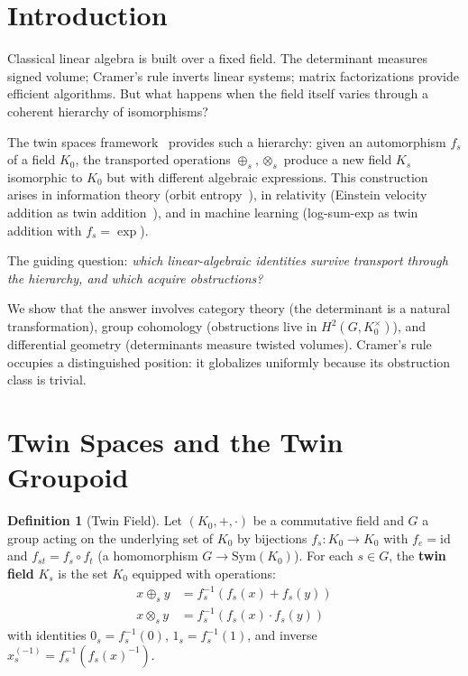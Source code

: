 \documentclass[11pt,twocolumn]{article}
\theoremstyle{plain}
\theoremstyle{definition}
\newtheorem{definition}[theorem]{Definition}
\theoremstyle{remark}
\begin{document}
\section{Introduction}

Classical linear algebra is built over a fixed field. The determinant measures signed volume; Cramer's rule inverts linear systems; matrix factorizations provide efficient algorithms. But what happens when the field itself varies through a coherent hierarchy of isomorphisms?

The twin spaces framework~\cite{nembe2026vol1,nembe2026vol3,nembe2026vol16} provides such a hierarchy: given an automorphism $f_s$ of a field $K_0$, the transported operations $\oplus_s, \otimes_s$ produce a new field $K_s$ isomorphic to $K_0$ but with different algebraic expressions. This construction arises in information theory (orbit entropy~\cite{nembe2026vol16}), in relativity (Einstein velocity addition as twin addition~\cite{nembe2026vol17}), and in machine learning (log-sum-exp as twin addition with $f_s = \exp$).

The guiding question: \emph{which linear-algebraic identities survive transport through the hierarchy, and which acquire obstructions?}

We show that the answer involves category theory (the determinant is a natural transformation), group cohomology (obstructions live in $H^2(G, K_0^\times)$), and differential geometry (determinants measure twisted volumes). Cramer's rule occupies a distinguished position: it globalizes uniformly because its obstruction class is trivial.


\section{Twin Spaces and the Twin Groupoid}
\label{sec:twin-spaces}

\begin{definition}[Twin Field]\label{def:twin-field}
Let $(K_0, +, \cdot)$ be a commutative field and $G$ a group acting on the underlying set of $K_0$ by bijections $f_s: K_0 \to K_0$ with $f_e = \mathrm{id}$ and $f_{st} = f_s \circ f_t$ (a homomorphism $G \to \mathrm{Sym}(K_0)$). For each $s \in G$, the \textbf{twin field} $K_s$ is the set $K_0$ equipped with operations:
\begin{align}
x \oplus_s y &= f_s^{-1}(f_s(x) + f_s(y)) \\
x \otimes_s y &= f_s^{-1}(f_s(x) \cdot f_s(y))
\end{align}
with identities $0_s = f_s^{-1}(0)$, $1_s = f_s^{-1}(1)$, and inverse $x^{(-1)}_s = f_s^{-1}(f_s(x)^{-1})$.
\end{definition}
\end{document}
